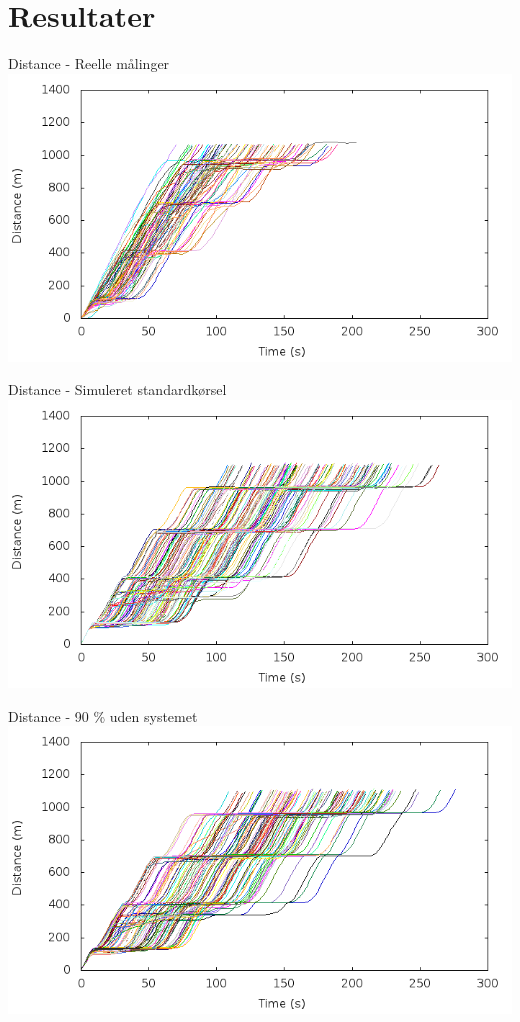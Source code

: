 \section{Resultater}

\begin{frame}{Distance - Reelle målinger}
\includegraphics[width=1\textwidth]{../Article/images/Real/RealDistance.png}
\end{frame}

\begin{frame}{Distance - Simuleret standardkørsel}
\includegraphics[width=1\textwidth]{../Article/images/tp0/distanceUncontrolled0.png}
\end{frame}

\begin{frame}{Distance - 90 \% uden systemet}
\includegraphics[width=1\textwidth]{images/distanceUncontrolled10.png}
\end{frame}

